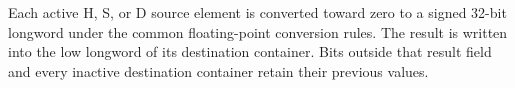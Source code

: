 Each active H, S, or D source element is converted toward zero to a signed
32-bit longword under the common floating-point conversion rules. The result
is written into the low longword of its destination container. Bits outside
that result field and every inactive destination container retain their
previous values.
